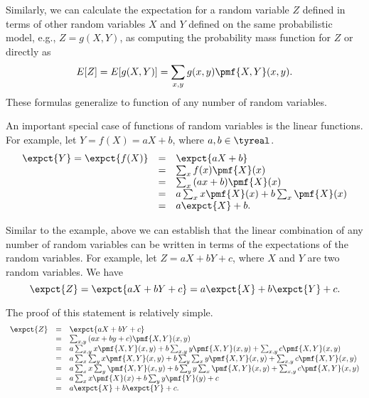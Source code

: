 {%

Similarly, we can calculate the expectation for a random variable $Z$
defined in terms of other random variables $X$ and $Y$ defined on the
same probabilistic model, e.g., $Z = g(X,Y)$, as computing the
probability mass function for $Z$ or directly as
\[
E[Z] = E[g(X,Y)] = \sum_{x,y}{g(x,y) \pmf{X,Y}(x,y)}.
\] 
These formulas generalize to function of any number of random
variables.

\begin{example}
An important special case of functions of random variables is the
linear functions.  For example, let $Y = f(X) = aX + b$, where $a, b
\in \tyreal$.
%
\[
\begin{array}{lll}
\expct{Y} = \expct{f(X)} 
& = & \expct{aX + b} 
\\
& = & \sum_{x}{f(x) \pmf{X}(x)}
\\
& = & \sum_{x}{(ax + b) \pmf{X}(x)}
\\
& = & a\sum_{x}{x\pmf{X}(x)} + b\sum_{x}{\pmf{X}(x)}
\\
& = & a\expct{X} + b.
\end{array}
\]

\end{example}

\begin{example}
Similar to the example, above we can establish that the linear
combination of any number of random variables can be written in terms
of the expectations of the random variables.  For example, let $Z = aX
+ bY + c$, where $X$ and $Y$ are two random variables. We have
\[
\expct{Z} = \expct{aX + bY + c} = a\expct{X} + b \expct{Y} + c.
\]

The proof of this statement is relatively simple.
\[
\begin{array}{lll}
\expct{Z} & = & \expct{aX + bY + c} 
\\
& = & \sum_{x,y}{(ax + by + c) \pmf{X,Y}(x,y)}
\\
& = & a\sum_{x,y}{x \pmf{X,Y}(x,y)} + b\sum_{x,y}{y \pmf{X,Y}(x,y)} + \sum_{x,y}{c \pmf{X,Y}(x,y)}
\\
& = & a\sum_{x}\sum_{y}{x \pmf{X,Y}(x,y)} + b\sum_{y}\sum_x{y  \pmf{X,Y}(x,y)} + \sum_{x,y}{c \pmf{X,Y}(x,y)}
\\
& = & a\sum_{x}x\sum_{y}{\pmf{X,Y}(x,y)} + b\sum_{y} y \sum_x{\pmf{X,Y}(x,y)} + \sum_{x,y}{c \pmf{X,Y}(x,y)}
\\
& = & a\sum_{x}x{\pmf{X}(x) + b\sum_{y} y \pmf{Y}(y)} + c
\\
& = & a \expct{X} + b \expct{Y} + c.
\end{array}
\]



\end{example}}
